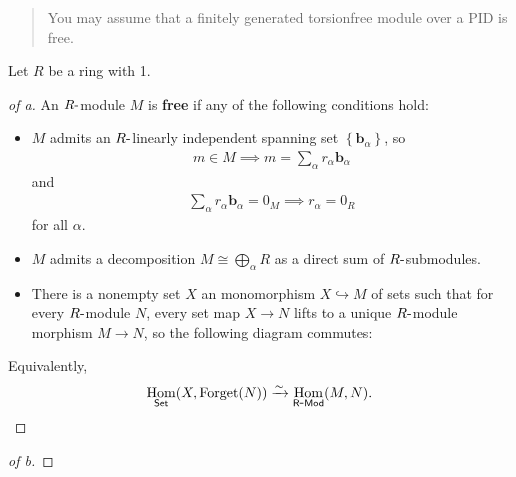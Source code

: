 \begin{quote}
You may assume that a finitely generated torsionfree module over a PID
is free.
\end{quote}

\begin{solution}

Let \(R\) be a ring with 1.

\begin{proof}[of a]

An \(R{\hbox{-}}\)module \(M\) is \textbf{free} if any of the following
conditions hold:

\begin{itemize}
\tightlist
\item
  \(M\) admits an \(R{\hbox{-}}\)linearly independent spanning set
  \(\left\{{\mathbf{b}_\alpha}\right\}\), so
  \begin{align*}m\in M \implies m = \sum_\alpha r_\alpha \mathbf{b}_\alpha\end{align*}
  and
  \begin{align*}\sum_\alpha r_\alpha \mathbf{b}_\alpha = 0_M \implies r_\alpha = 0_R\end{align*}
  for all \(\alpha\).
\item
  \(M\) admits a decomposition \(M \cong \bigoplus_{\alpha} R\) as a
  direct sum of \(R{\hbox{-}}\)submodules.
\item
  There is a nonempty set \(X\) an monomorphism \(X\hookrightarrow M\)
  of sets such that for every \(R{\hbox{-}}\)module \(N\), every set map
  \(X\to N\) lifts to a unique \(R{\hbox{-}}\)module morphism
  \(M\to N\), so the following diagram commutes:
\end{itemize}

\begin{center}
\end{center}

Equivalently,
\begin{align*}
\mathop{\mathrm{Hom}}_{\mathsf{Set}}(X, \mathop{\mathrm{Forget}}(N)) \xrightarrow{\sim} \mathop{\mathrm{Hom}}_{{\mathsf{R}{\hbox{-}}\mathsf{Mod}}}(M, N)
.\end{align*}

\end{proof}

\begin{proof}[of b]


\end{proof}
\end{solution}
